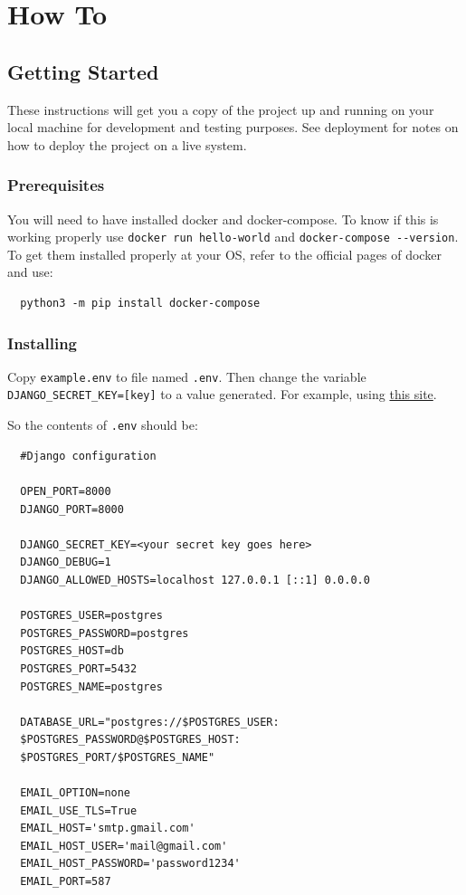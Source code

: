 \documentclass[11pt]{article}
\begin{document}
\newpage
\section{How To}
\label{sec:orgc1d500a}
\subsection{Getting Started}
\label{sec:orga657ce3}
These instructions will get you a copy of the project up and running on
your local machine for development and testing purposes. See deployment
for notes on how to deploy the project on a live system.

\subsubsection{Prerequisites}
\label{sec:org56cc4f8}
You will need to have installed docker and docker-compose. To know if
this is working properly use \texttt{docker run hello-world} and
\texttt{docker-compose -{}-version}. To get them installed properly at your OS,
refer to the official pages of docker and use:

\begin{verbatim}
  python3 -m pip install docker-compose
\end{verbatim}

\subsubsection{Installing}
Copy \texttt{example.env} to file named \texttt{.env}. Then change the variable
\texttt{DJANGO\_SECRET\_KEY=[key]} to a value generated. For example, using
\href{https://miniwebtool.com/django-secret-key-generator/}{this site}.

So the contents of \texttt{.env} should be:

\begin{verbatim}
  #Django configuration

  OPEN_PORT=8000
  DJANGO_PORT=8000

  DJANGO_SECRET_KEY=<your secret key goes here>
  DJANGO_DEBUG=1
  DJANGO_ALLOWED_HOSTS=localhost 127.0.0.1 [::1] 0.0.0.0

  POSTGRES_USER=postgres
  POSTGRES_PASSWORD=postgres
  POSTGRES_HOST=db
  POSTGRES_PORT=5432
  POSTGRES_NAME=postgres

  DATABASE_URL="postgres://$POSTGRES_USER:
  $POSTGRES_PASSWORD@$POSTGRES_HOST:
  $POSTGRES_PORT/$POSTGRES_NAME"

  EMAIL_OPTION=none
  EMAIL_USE_TLS=True
  EMAIL_HOST='smtp.gmail.com'
  EMAIL_HOST_USER='mail@gmail.com'
  EMAIL_HOST_PASSWORD='password1234'
  EMAIL_PORT=587
\end{verbatim}
\end{document}
